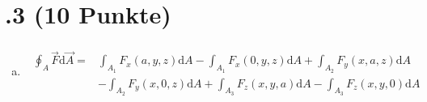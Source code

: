 \section*{\nr.3 \titthree (10 Punkte)}
\begin{enumerate}[(a)]
\item

\begin{align}
\begin{split}
\oint_A \vec{F}\mathrm{d}\vec{A} = &\int_{A_{1}} F_{x}(a,y,z)\mathrm{d}A - \int_{A_{1}} F_{x}(0,y,z)\mathrm{d}A + \int_{A_{2}} F_{y}(x,a,z)\mathrm{d}A \\ 
 &- \int_{A_{2}} F_{y}(x,0,z)\mathrm{d}A + \int_{A_{3}} F_{z}(x,y,a)\mathrm{d}A - \int_{A_{3}} F_{z}(x,y,0)\mathrm{d}A 
\end{split}
\end{align}

\end{enumerate}